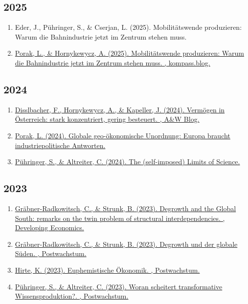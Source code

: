 \subsection*{2025}
\begin{enumerate}
	 \item Eder, J., Pühringer, S., \& Cserjan, L. (2025). Mobilitätswende produ­zieren: Warum die Bahn­industrie jetzt im Zentrum stehen muss.
	 \item \href{https://kompass.blog/public-brief/mobilitaetswende-produzieren-warum-die-bahnindustrie-jetzt-im-zentrum-stehen-muss/}{Porak, L., \& Hornykewycz, A. (2025). Mobilitätswende produzieren: Warum die Bahnindustrie jetzt im Zentrum stehen muss. , kompass.blog.}
\end{enumerate}
\subsection*{2024}
\begin{enumerate}
	 \item \href{https://www.awblog.at/Verteilung/Vermoegen-in-Oesterreich-stark-konzentriert-gering-besteuert}{Disslbacher, F., Hornykewycz, A., \& Kapeller, J. (2024). Vermögen in Österreich: stark konzen­triert, gering be­steuert. , A\&W Blog.}
	 \item \href{https://www.awblog.at/Europa/Europa-braucht-industriepolitische-Antworten}{Porak, L. (2024). Globale geo-ökonomische Unordnung: Europa braucht industriepolitische Antworten.}
	 \item \href{https://www.econ4future.org/articles/the-self-imposed-limits-of-science}{Pühringer, S., \& Altreiter, C. (2024). The (self-imposed) Limits of Science.}
\end{enumerate}
\subsection*{2023}
\begin{enumerate}
	 \item \href{https://developingeconomics.org/2023/11/06/degrowth-and-the-global-south-remarks-on-the-twin-problem-of-structural-interdependencies/}{Gräbner-Radkowitsch, C., \& Strunk, B. (2023). Degrowth and the Global South: remarks on the twin problem of structural interdependencies. , Developing Economics.}
	 \item \href{https://www.postwachstum.de/degrowth-und-der-globale-sueden-20231023}{Gräbner-Radkowitsch, C., \& Strunk, B. (2023). Degrowth und der globale Süden. , Postwachstum.}
	 \item \href{https://www.postwachstum.de/postwachstum-und-kapitalismus-ein-widerspruch-7-20230704#}{Hirte, K. (2023). Euphemistische Ökonomik. , Postwachstum.}
	 \item \href{https://www.postwachstum.de/postwachstum-und-kapitalismus-ein-widerspruch-5-20230112}{Pühringer, S., \& Altreiter, C. (2023). Woran scheitert transformative Wissensproduktion?. , Postwachstum.}
\end{enumerate}
